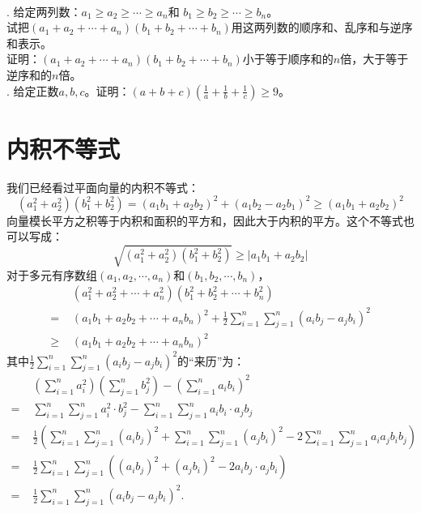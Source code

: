\documentclass[12pt,UTF8,fontset=none]{ctexbook}
\begin{document}
\begin{xt}    
    \mbox{}\\
    . 给定两列数：$a_1 \geqslant a_2 \geqslant \cdots \geqslant a_n$和
$b_1 \geqslant b_2 \geqslant \cdots \geqslant b_n$。\\
     试把$(a_1 + a_2 + \cdots + a_n)(b_1 + b_2 + \cdots + b_n)$用这两列数的顺序和、乱序和与逆序和表示。\\
     证明：$(a_1 + a_2 + \cdots + a_n)(b_1 + b_2 + \cdots + b_n)$小于等于顺序和的$n$倍，大于等于逆序和的$n$倍。 \\
    . 给定正数$a,b,c$。证明：$(a + b + c)(\frac{1}{a}+\frac{1}{b}+\frac{1}{c}) \geqslant 9$。
\end{xt}

\section{内积不等式}

我们已经看过平面向量的内积不等式：
$$
(a_1^2 + a_2^2)(b_1^2 + b_2^2) = (a_1b_1 + a_2b_2)^2 + (a_1b_2 - a_2b_1)^2 \geqslant (a_1b_1 + a_2b_2)^2
$$
向量模长平方之积等于内积和面积的平方和，因此大于内积的平方。这个不等式也可以写成：
$$
\sqrt{(a_1^2 + a_2^2)(b_1^2 + b_2^2)} \geqslant |a_1b_1 + a_2b_2|
$$
对于多元有序数组$(a_1, a_2, \cdots, a_n)$和$(b_1, b_2, \cdots, b_n)$，
\begin{align*}
&(a_1^2 + a_2^2 + \cdots + a_n^2)(b_1^2 + b_2^2 + \cdots + b_n^2)  \\
=\,\,& (a_1b_1 + a_2b_2 + \cdots + a_nb_n)^2 + \frac{1}{2}\sum_{i=1}^n\sum_{j=1}^n(a_ib_j - a_jb_i)^2  \\
\geqslant\,\,& (a_1b_1 + a_2b_2 + \cdots + a_nb_n)^2  
\end{align*}
其中$\frac{1}{2}\sum_{i=1}^n\sum_{j=1}^n(a_ib_j - a_jb_i)^2$的“来历”为：
\begin{align*}
&\left(\sum_{i=1}^n a_i^2\right) \left(\sum_{j=1}^n b_j^2\right) - \left(\sum_{i=1}^n a_ib_i\right)^2  \\
=\,\,& \sum_{i=1}^n\sum_{j=1}^n a_i^2 \cdot b_j^2 - \sum_{i=1}^n\sum_{j=1}^n a_ib_i\cdot a_jb_j  \\
=\,\,& \frac{1}{2}\left(\sum_{i=1}^n\sum_{j=1}^n (a_ib_j)^2 + \sum_{i=1}^n\sum_{j=1}^n (a_jb_i)^2 -  2 \sum_{i=1}^n\sum_{j=1}^n a_ia_jb_ib_j \right)  \\
=\,\,& \frac{1}{2}\sum_{i=1}^n\sum_{j=1}^n \left( (a_ib_j)^2 + (a_jb_i)^2 -  2 a_ib_j\cdot a_jb_i \right)  \\ 
=\,\,& \frac{1}{2}\sum_{i=1}^n\sum_{j=1}^n \left( a_ib_j - a_jb_i \right)^2.  
\end{align*}
\end{document}

